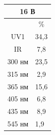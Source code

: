 \documentclass[a4paper,14pt]{extreport}
\begin{document}
\begin{tcolorbox}[colback=red!5,colframe=red!75!black,title=Ртуть] 
\tcblower
	\begin{center}
		\begin{tabular}{|c|c|}
		\hline
		\multicolumn{2}{|c|}{16 В}                              \\ \hline
		                             & \%                       \\ \hline
		UV1                          & 34,3                     \\ \hline
		IR                           & 7,8                      \\ \hline
		300 нм                       & 23,5                     \\ \hline
		315 нм                       & 2,9                      \\ \hline
		365 нм                       & 15,6                     \\ \hline
		405 нм                       & 6,8                      \\ \hline
		435 нм                       & 8,9                      \\ \hline
		\multicolumn{1}{|l|}{545 нм} & \multicolumn{1}{l|}{1,9} \\ \hline
		\end{tabular}
	\end{center}
\end{tcolorbox}
\newpage
\end{document}
